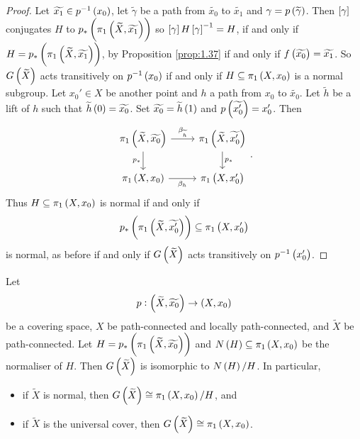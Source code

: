 \pagebreak

\begin{proof}
Let $ \widetilde{x_1} \in p^{-1}\br{x_0} $, let $ \widetilde{\gamma} $ be a path from $ \widetilde{x_0} $ to $ \widetilde{x_1} $ and $ \gamma = p\br{\widetilde{\gamma}} $. Then $ \sbr{\gamma} $ conjugates $ H $ to $ p_*\br{\pi_1\br{\widetilde{X}, \widetilde{x_1}}} $ so $ \sbr{\gamma}H\sbr{\gamma}^{-1} = H $, if and only if $ H = p_*\br{\pi_1\br{\widetilde{X}, \widetilde{x_1}}} $, by Proposition \ref{prop:1.37} if and only if $ f\br{\widetilde{x_0}} = \widetilde{x_1} $. So $ G\br{\widetilde{X}} $ acts transitively on $ p^{-1}\br{x_0} $ if and only if $ H \subseteq \pi_1\br{X, x_0} $ is a normal subgroup. Let $ x_0' \in X $ be another point and $ h $ a path from $ x_0 $ to $ \widetilde{x_0} $. Let $ \widetilde{h} $ be a lift of $ h $ such that $ \widetilde{h}\br{0} = \widetilde{x_0} $. Set $ \widetilde{x_0} = \widetilde{h}\br{1} $ and $ p\br{\widetilde{x_0'}} = x_0' $. Then
$$
\begin{tikzcd}
\pi_1\br{\widetilde{X}, \widetilde{x_0}} \arrow{r}{\beta_{\widetilde{h}}} \arrow[swap]{d}{p_*} & \pi_1\br{\widetilde{X}, \widetilde{x_0'}} \arrow{d}{p_*} \\
\pi_1\br{X, x_0} \arrow[swap]{r}{\beta_h} & \pi_1\br{X, x_0'}
\end{tikzcd}.
$$
Thus $ H \subseteq \pi_1\br{X, x_0} $ is normal if and only if
$$ p_*\br{\pi_1\br{\widetilde{X}, \widetilde{x_0'}}} \subseteq \pi_1\br{X, x_0'} $$ is normal, as before if and only if $ G\br{\widetilde{X}} $ acts transitively on $ p^{-1}\br{x_0'} $.
\end{proof}


\begin{proposition}
Let
$$ p : \br{\widetilde{X}, \widetilde{x_0}} \to \br{X, x_0} $$
be a covering space, $ X $ be path-connected and locally path-connected, and $ \widetilde{X} $ be path-connected. Let $ H = p_*\br{\pi_1\br{\widetilde{X}, \widetilde{x_0}}} $ and $ N\br{H} \subseteq \pi_1\br{X, x_0} $ be the normaliser of $ H $. Then $ G\br{\widetilde{X}} $ is isomorphic to $ N\br{H} / H $. In particular,
\begin{itemize}
\item if $ \widetilde{X} $ is normal, then $ G\br{\widetilde{X}} \cong \pi_1\br{X, x_0} / H $, and
\item if $ \widetilde{X} $ is the universal cover, then $ G\br{\widetilde{X}} \cong \pi_1\br{X, x_0} $.
\end{itemize}
\end{proposition}

